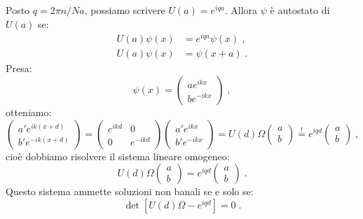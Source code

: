 \documentclass[12pt,a4paper]{report}
\theoremstyle{definition}
\numberwithin{equation}{section}
\begin{document}
Posto $q=2\pi n/Na$, possiamo scrivere $U(a)=e^{iqa}$. Allora $\psi$ è autostato di $U(a)$ se:
\begin{align*}
U(a)\psi(x)&=e^{iqa}\psi(x)\;, \\
U(a)\psi(x)&=\psi(x+a)\;.
\end{align*}
Presa:
\begin{equation}
\psi(x)=\left(
\begin{matrix}
ae^{ikx} \\
be^{-ikx}
\end{matrix}\right)\;,
\end{equation}
otteniamo:
\begin{equation*}
\left(\begin{matrix}
a'e^{ik(x+d)} \\
b'e^{-ik(x+d)}
\end{matrix}\right)=\left(\begin{matrix}
e^{ikd} & 0 \\
0 & e^{-ikd}
\end{matrix}\right)\left(\begin{matrix}
a'e^{ikx} \\
b'e^{-ikx}
\end{matrix}\right)=U(d)\Omega\left(
\begin{matrix}
a \\
b
\end{matrix}\right)\stackrel{!}{=}e^{iqd}\left(
\begin{matrix}
a \\
b
\end{matrix}\right)\;,
\end{equation*}
cioè dobbiamo risolvere il sistema lineare omogeneo:
\begin{equation}
U(d)\Omega\left(\begin{matrix}
a \\
b
\end{matrix}\right)=e^{iqd}\left(\begin{matrix}
a \\
b
\end{matrix}\right)\;.
\end{equation}
Questo sistema ammette soluzioni non banali se e solo se:
\begin{equation}
\det\left[U(d)\Omega-e^{iqd}\right]=0\;.
\end{equation}
\end{document}
